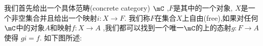 \begin{definition}[][自由对象]
    我们首先给出一个具体范畴(concrete category) $\mC$ ,$F$是其中的一个对象, $X$是一个非空集合并且给出一个映射$i\colon X\to F$.  我们称$F$在集合$X$上自由(free),如果对任何$\mC$中的对象$A$和映射$f\colon X\to A$ ,我们都可以找到一个唯一$\mC$的上的态射$g\colon F\to A$使得 $gi=f$. 如下图所述:
\end{definition}














